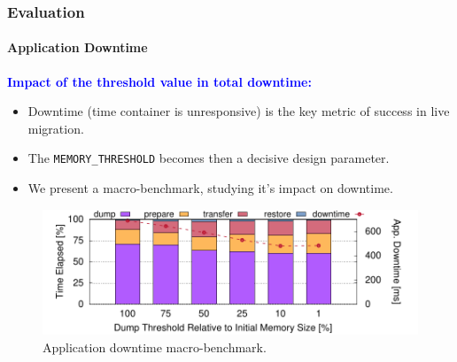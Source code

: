\documentclass[9pt,    %
    english,            %
    xcolor=table,       %
    envcountsect,        %
    aspectratio=169     %
]{beamer}
\begin{document}
\begin{frame}
    \frametitle{Evaluation}
    \framesubtitle{Application Downtime}

    \vspace{10pt}

    \textbf{\textcolor{blue}{Impact of the threshold value in total downtime:}}
    \begin{itemize}
        \item Downtime (time container is unresponsive) is the key metric of success in live migration.
        \item The \texttt{MEMORY\_THRESHOLD} becomes then a decisive design parameter.
        \item We present a macro-benchmark, studying it's impact on downtime.
    \end{itemize}

    \vspace{-5pt}

    \begin{figure}
        \centering
        \includegraphics[width=.75\textwidth]{./figs/downtime.pdf}
        \caption{Application downtime macro-benchmark.\label{fig:diskless-microbecnhmark}}
    \end{figure}
    
\end{frame}
\end{document}
